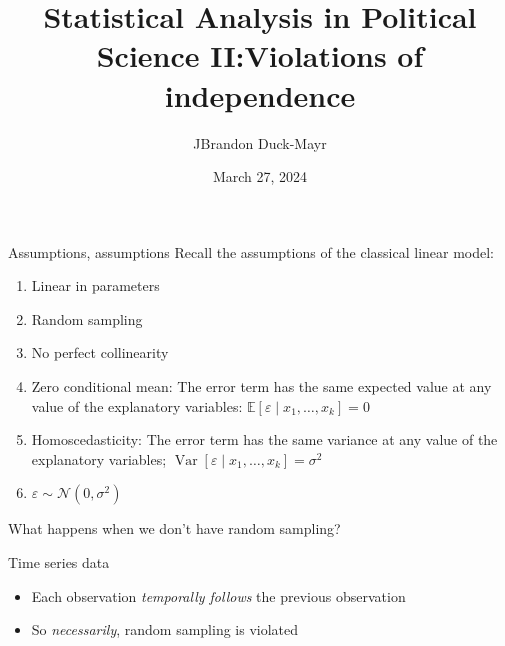 \documentclass[
  ignorenonframetext,
]{beamer}
\title{Statistical Analysis in Political Science II:\newline Violations of independence}
\author{JBrandon Duck-Mayr}
\date{March 27, 2024}
\providecommand{\tightlist}{%
  \setlength{\itemsep}{0pt}\setlength{\parskip}{0pt}}
\newcommand{\setsep}{\setlength{\itemsep}{3pt}}
\newcommand{\setskip}{\setlength{\parskip}{3pt}}
\renewcommand{\tightlist}{\setsep\setskip}
\begin{document}
\frame{\titlepage}

\begin{frame}{Assumptions, assumptions}
\protect\hypertarget{assumptions-assumptions}{}
Recall the assumptions of the classical linear model:

\pause

\begin{enumerate}
\tightlist
\item
  Linear in parameters
\item
  Random sampling
\item
  No perfect collinearity
\item
  Zero conditional mean: The error term has the same expected value at any value of the explanatory variables: \(\ensuremath{\mathbb{E}\left[\varepsilon \mid x_1, \dots, x_k\right]} = 0\)
\item
  Homoscedasticity: The error term has the same variance at any value of the explanatory variables; \(\ensuremath{\mathop{\mathrm{Var}}\left[\varepsilon \mid x_1, \dots, x_k\right]} = \sigma^2\)
\item
  \(\varepsilon \sim \mathcal{N}\left( 0, \sigma^2 \right)\)
\end{enumerate}

\pause

What happens when we don't have random sampling?
\end{frame}

\begin{frame}{Time series data}
\protect\hypertarget{time-series-data}{}
\pause

\begin{itemize}[<+->]
\tightlist
\item
  Each observation \emph{temporally follows} the previous observation
\item
  So \emph{necessarily}, random sampling is violated
\end{itemize}
\end{frame}
\end{document}

